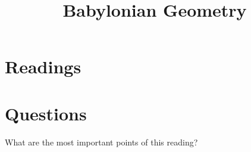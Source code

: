 \documentclass{ximera}
\title{Babylonian Geometry}
\begin{document}
\begin{abstract}
\end{abstract}
\maketitle






\section{Readings}








\section{Questions}




\begin{question}
What are the most important points of this reading?
\begin{freeResponse}
\end{freeResponse}
\end{question}
\end{document}
